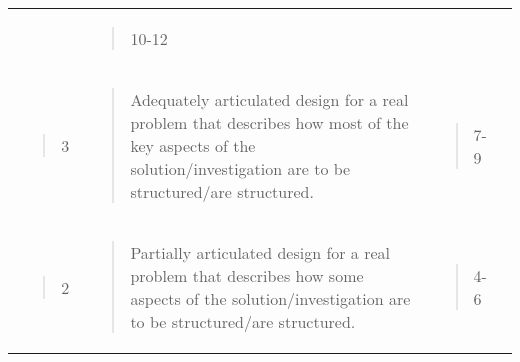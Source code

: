 \documentclass[
]{article}
\begin{document}
\begin{longtable}[]{@{}llll@{}}
\begin{minipage}[t]{0.22\columnwidth}
\end{minipage} & \begin{minipage}[t]{0.22\columnwidth}\raggedright
\begin{quote}
10-12
\end{quote}\strut
\end{minipage} & \begin{minipage}[t]{0.22\columnwidth}\raggedright
\strut
\end{minipage}\tabularnewline
\begin{minipage}[t]{0.22\columnwidth}\raggedright
\begin{quote}
3
\end{quote}\strut
\end{minipage} & \begin{minipage}[t]{0.22\columnwidth}\raggedright
\begin{quote}
Adequately articulated design for a real problem that describes how most
of the key aspects of the solution/investigation are to be
structured/are structured.
\end{quote}\strut
\end{minipage} & \begin{minipage}[t]{0.22\columnwidth}\raggedright
\begin{quote}
7-9
\end{quote}\strut
\end{minipage} & \begin{minipage}[t]{0.22\columnwidth}\raggedright
\strut
\end{minipage}\tabularnewline
\begin{minipage}[t]{0.22\columnwidth}\raggedright
\begin{quote}
2
\end{quote}\strut
\end{minipage} & \begin{minipage}[t]{0.22\columnwidth}\raggedright
\begin{quote}
Partially articulated design for a real problem that describes how some
aspects of the solution/investigation are to be structured/are
structured.
\end{quote}\strut
\end{minipage} & \begin{minipage}[t]{0.22\columnwidth}\raggedright
\begin{quote}
4-6
\end{quote}\strut
\end{minipage} & \begin{minipage}[t]{0.22\columnwidth}\raggedright

\end{minipage}
\end{longtable}
\end{document}
